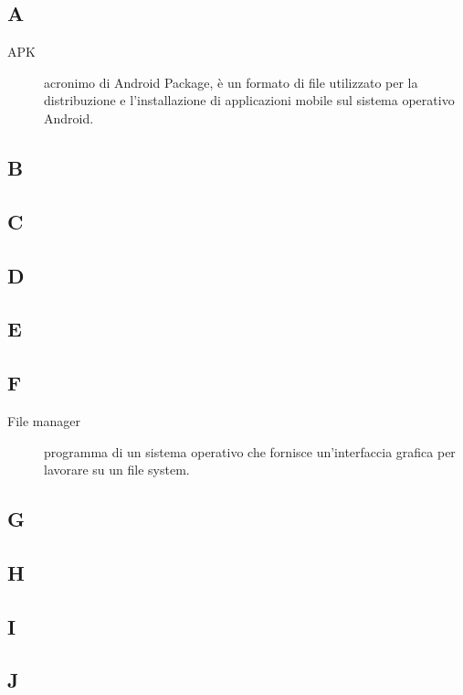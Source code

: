 \documentclass[../../../analisi-dei-requisiti.tex]{subfiles}
\begin{document}
\subsection{A}
\begin{description}
    \item[APK] acronimo di Android Package, è un formato di file utilizzato per la distribuzione e l'installazione di applicazioni mobile sul sistema operativo Android.
\end{description}

\subsection{B}

\subsection{C}

\subsection{D}

\subsection{E}

\subsection{F}
\begin{description}
    \item[File manager] programma di un sistema operativo che fornisce un'interfaccia grafica per lavorare su un file system.
\end{description}

\subsection{G}

\subsection{H}

\subsection{I}

\subsection{J}
\end{document}
